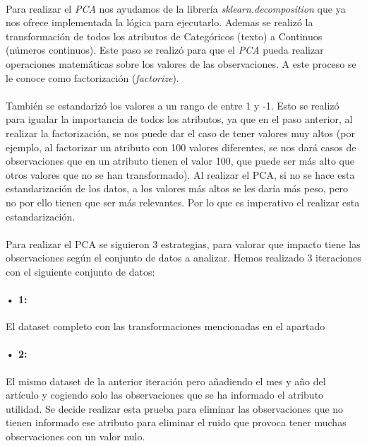 \label{section:pca_standar}
\paragraph{}
Para realizar el \textit{PCA} nos ayudamos de la librería \textit{sklearn.decomposition} que ya nos ofrece implementada la lógica para ejecutarlo. Ademas se realizó la transformación de todos los atributos de Categóricos (texto) a Continuos (números continuos). Este paso se realizó para que el \textit{PCA} pueda realizar operaciones matemáticas sobre los valores de las observaciones. A este proceso se le conoce como factorización (\textit{factorize}). 

\paragraph{}
También se estandarizó los valores a un rango de entre 1 y -1. Esto se realizó para igualar la importancia de todos los atributos, ya que en el paso anterior, al realizar la factorización, se nos puede dar el caso de tener valores muy altos (por ejemplo, al factorizar un atributo con 100 valores diferentes, se nos dará casos de observaciones que en un atributo tienen el valor 100, que puede ser más alto que otros valores que no se han transformado). Al realizar el PCA, si no se hace esta estandarización de los datos, a los valores más altos se les daría más peso, pero no por ello tienen que ser más relevantes. Por lo que es imperativo el realizar esta estandarización.

\paragraph{}
Para realizar el PCA se siguieron 3 estrategias, para valorar que impacto tiene las observaciones según el conjunto de datos a analizar. Hemos realizado 3 iteraciones con el siguiente conjunto de datos:

\paragraph{• 1: } El dataset completo con las transformaciones mencionadas en el apartado 

\paragraph{• 2: } \label{section:pca_case2}El mismo dataset de la anterior iteración pero añadiendo el mes y año del artículo y cogiendo solo las observaciones que se ha informado el atributo utilidad. Se decide realizar esta prueba para eliminar las observaciones que no tienen informado ese atributo para eliminar el ruido\cite{ref:noisy_data} que provoca tener muchas observaciones con un valor nulo.

